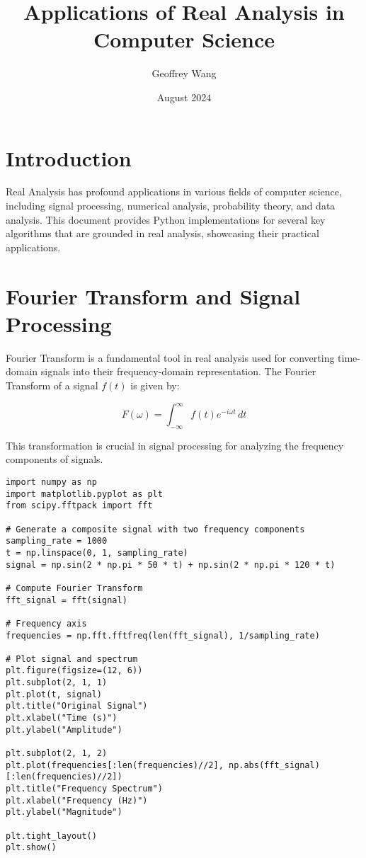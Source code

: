 \documentclass{article}
\title{Applications of Real Analysis in Computer Science}
\author{Geoffrey Wang}
\date{August 2024}
\begin{document}
\maketitle

\section{Introduction}
Real Analysis has profound applications in various fields of computer science, including signal processing, numerical analysis, probability theory, and data analysis. This document provides Python implementations for several key algorithms that are grounded in real analysis, showcasing their practical applications.

\section{Fourier Transform and Signal Processing}
Fourier Transform is a fundamental tool in real analysis used for converting time-domain signals into their frequency-domain representation. The Fourier Transform of a signal \( f(t) \) is given by:

\[
F(\omega) = \int_{-\infty}^{\infty} f(t) e^{-i \omega t} \, dt
\]

This transformation is crucial in signal processing for analyzing the frequency components of signals.

\begin{lstlisting}[caption={Fourier Transform and Signal Processing in Python}, label=code:fourier]
import numpy as np
import matplotlib.pyplot as plt
from scipy.fftpack import fft

# Generate a composite signal with two frequency components
sampling_rate = 1000
t = np.linspace(0, 1, sampling_rate)
signal = np.sin(2 * np.pi * 50 * t) + np.sin(2 * np.pi * 120 * t)

# Compute Fourier Transform
fft_signal = fft(signal)

# Frequency axis
frequencies = np.fft.fftfreq(len(fft_signal), 1/sampling_rate)

# Plot signal and spectrum
plt.figure(figsize=(12, 6))
plt.subplot(2, 1, 1)
plt.plot(t, signal)
plt.title("Original Signal")
plt.xlabel("Time (s)")
plt.ylabel("Amplitude")

plt.subplot(2, 1, 2)
plt.plot(frequencies[:len(frequencies)//2], np.abs(fft_signal)[:len(frequencies)//2])
plt.title("Frequency Spectrum")
plt.xlabel("Frequency (Hz)")
plt.ylabel("Magnitude")

plt.tight_layout()
plt.show()
\end{lstlisting}
\end{document}
